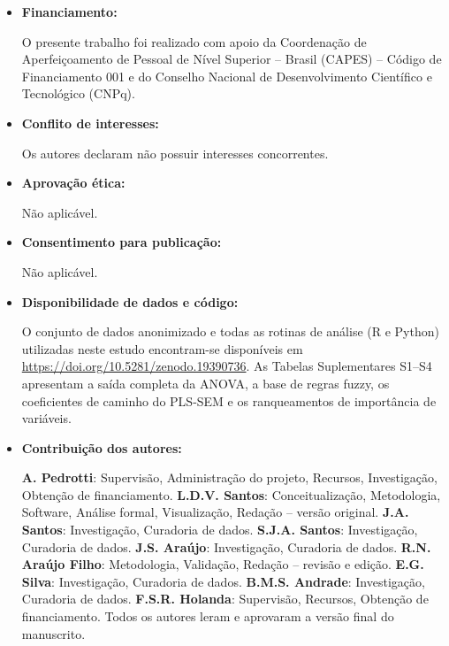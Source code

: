 \documentclass[pdflatex,sn-basic]{sn-jnl}%
\begin{document}
\begin{itemize}
\item \textbf{Financiamento:} 

O presente trabalho foi realizado com apoio da Coordenação de Aperfeiçoamento de Pessoal de Nível Superior -- Brasil (CAPES) -- Código de Financiamento 001 e do Conselho Nacional de Desenvolvimento Científico e Tecnológico (CNPq).
\item \textbf{Conflito de interesses:} 

Os autores declaram não possuir interesses concorrentes.
\item \textbf{Aprovação ética:} 

Não aplicável.
\item \textbf{Consentimento para publicação:} 

Não aplicável.
\item \textbf{Disponibilidade de dados e código:} 

O conjunto de dados anonimizado e todas as rotinas de análise (R e Python) utilizadas neste estudo encontram-se disponíveis em \url{https://doi.org/10.5281/zenodo.19390736}. As Tabelas Suplementares S1--S4 apresentam a saída completa da ANOVA, a base de regras fuzzy, os coeficientes de caminho do PLS-SEM e os ranqueamentos de importância de variáveis.

\item \textbf{Contribuição dos autores:} 

\textbf{A. Pedrotti}: Supervisão, Administração do projeto, Recursos, Investigação, Obtenção de financiamento. \textbf{L.D.V. Santos}: Conceitualização, Metodologia, Software, Análise formal, Visualização, Redação -- versão original. \textbf{J.A. Santos}: Investigação, Curadoria de dados. \textbf{S.J.A. Santos}: Investigação, Curadoria de dados. \textbf{J.S. Araújo}: Investigação, Curadoria de dados. \textbf{R.N. Araújo Filho}: Metodologia, Validação, Redação -- revisão e edição. \textbf{E.G. Silva}: Investigação, Curadoria de dados. \textbf{B.M.S. Andrade}: Investigação, Curadoria de dados. \textbf{F.S.R. Holanda}: Supervisão, Recursos, Obtenção de financiamento. Todos os autores leram e aprovaram a versão final do manuscrito.
\end{itemize}

\end{document}

